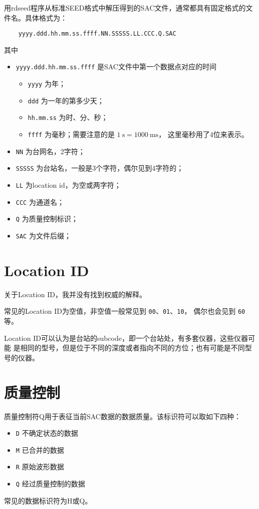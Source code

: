 用rdseed程序从标准SEED格式中解压得到的SAC文件，通常都具有固定格式的文件名。具体格式为：
\begin{verbatim}
    yyyy.ddd.hh.mm.ss.ffff.NN.SSSSS.LL.CCC.Q.SAC
\end{verbatim}
其中
\begin{itemize}
\item \texttt{yyyy.ddd.hh.mm.ss.ffff} 是SAC文件中第一个数据点对应的时间
    \begin{itemize}
    \item \texttt{yyyy} 为年；
    \item \texttt{ddd} 为一年的第多少天；
    \item \texttt{hh.mm.ss} 为时、分、秒；
    \item \texttt{ffff} 为毫秒；需要注意的是 $\SI{1}{\s}=\SI{1000}{\ms}$，
        这里毫秒用了4位来表示。
    \end{itemize}
\item \texttt{NN} 为台网名，2字符；
\item \texttt{SSSSS} 为台站名，一般是3个字符，偶尔见到4字符的；
\item \texttt{LL} 为location id，为空或两字符；
\item \texttt{CCC} 为通道名；
\item \texttt{Q} 为质量控制标识；
\item \texttt{SAC} 为文件后缀；
\end{itemize}

\section{Location ID}
关于Location ID，我并没有找到权威的解释。

常见的Location ID为空值，非空值一般常见到 \texttt{00}、\texttt{01}、\texttt{10}，
偶尔也会见到 \texttt{60} 等。

Location ID可以认为是台站的subcode，即一个台站处，有多套仪器，这些仪器可能
是相同的型号，但是位于不同的深度或者指向不同的方位；也有可能是不同型号的仪器。

\section{质量控制}
质量控制符Q用于表征当前SAC数据的数据质量。该标识符可以取如下四种：
\begin{itemize}
\item \texttt{D} 不确定状态的数据
\item \texttt{M} 已合并的数据
\item \texttt{R} 原始波形数据
\item \texttt{Q} 经过质量控制的数据
\end{itemize}
常见的数据标识符为H或Q。

